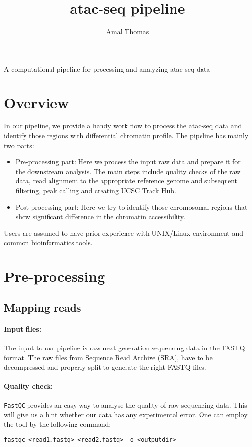\documentclass[10pt]{article}
\title{\bf atac-seq pipeline}
\author{Amal Thomas}
\newcommand{\prog}[1]{\texttt{#1}}
\begin{document}
\maketitle

\begin{center}
A computational pipeline for processing and analyzing atac-seq data
\end{center} 


\section{Overview}
In our pipeline, we provide a handy work flow to process the atac-seq data and identify those regions with differential chromatin profile. The pipeline has mainly two parts:
\begin{itemize}
\item Pre-processing part: Here we process the input raw data and prepare it for the downstream analysis. The main steps include quality checks of the raw data, read alignment to the appropriate reference genome and subsequent filtering, peak calling and creating UCSC Track Hub. 
\item Post-processing part: Here we try to identify those chromosomal regions that show significant difference in the chromatin accessibility. 
\end{itemize}
Users are assumed to have prior experience with UNIX/Linux environment and common bioinformatics tools.

\section{Pre-processing}

\subsection{Mapping reads}
\paragraph{Input files:} The input to our pipeline is raw next generation sequencing data in the FASTQ format. The raw files from Sequence Read Archive (SRA), have to be decompressed and properly split to generate the right FASTQ files.
\paragraph{Quality check:} \prog{FastQC} provides an easy way to analyse the quality of raw sequencing data. This will give us a hint whether our data has any experimental error. One can employ the tool by the following command:
\begin{verbatim}
fastqc <read1.fastq> <read2.fastq> -o <outputdir>
\end{verbatim}
\end{document}
